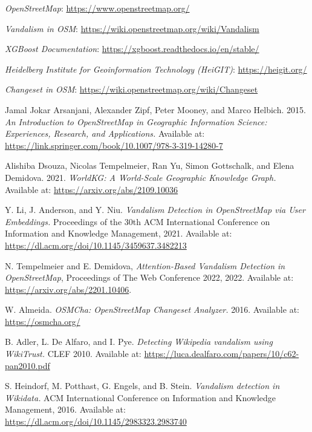 \documentclass[
    13pt, %
    a4paper, %
    listof=totoc, %
    bibliography=totoc, %
    index=totoc, %
    headsepline
]{scrreprt}
\begin{document}
\begin{thebibliography}{9}

\textit{OpenStreetMap}: \url{https://www.openstreetmap.org/}

\textit{Vandalism in OSM}: \url{https://wiki.openstreetmap.org/wiki/Vandalism}

\textit{XGBoost Documentation}: \url{https://xgboost.readthedocs.io/en/stable/}

\textit{Heidelberg Institute for Geoinformation Technology (HeiGIT)}: \url{https://heigit.org/}

\textit{Changeset in OSM}: \url{https://wiki.openstreetmap.org/wiki/Changeset}

Jamal Jokar Arsanjani, Alexander Zipf, Peter Mooney, and Marco Helbich. 2015.
\textit{An Introduction to OpenStreetMap in Geographic Information Science: Experiences, Research, and Applications.}
Available at: \url{https://link.springer.com/book/10.1007/978-3-319-14280-7}

Alishiba Dsouza, Nicolas Tempelmeier, Ran Yu, Simon Gottschalk, and Elena Demidova. 2021.
\textit{WorldKG: A World-Scale Geographic Knowledge Graph.}
Available at: \url{https://arxiv.org/abs/2109.10036}

Y. Li, J. Anderson, and Y. Niu.
\textit{Vandalism Detection in OpenStreetMap via User Embeddings.}
Proceedings of the 30th ACM International Conference on Information and Knowledge Management, 2021.
Available at: \url{https://dl.acm.org/doi/10.1145/3459637.3482213}

N. Tempelmeier and E. Demidova,
\textit{Attention-Based Vandalism Detection in OpenStreetMap},
Proceedings of The Web Conference 2022, 2022.
Available at: \url{https://arxiv.org/abs/2201.10406}.

W. Almeida.
\textit{OSMCha: OpenStreetMap Changeset Analyzer.}
2016.
Available at: \url{https://osmcha.org/}

B. Adler, L. De Alfaro, and I. Pye.
\textit{Detecting Wikipedia vandalism using WikiTrust.}
CLEF 2010.
Available at: \url{https://luca.dealfaro.com/papers/10/c62-pan2010.pdf}

S. Heindorf, M. Potthast, G. Engels, and B. Stein.
\textit{Vandalism detection in Wikidata.}
ACM International Conference on Information and Knowledge Management, 2016.
Available at: \url{https://dl.acm.org/doi/10.1145/2983323.2983740}


\end{thebibliography}
\end{document}
